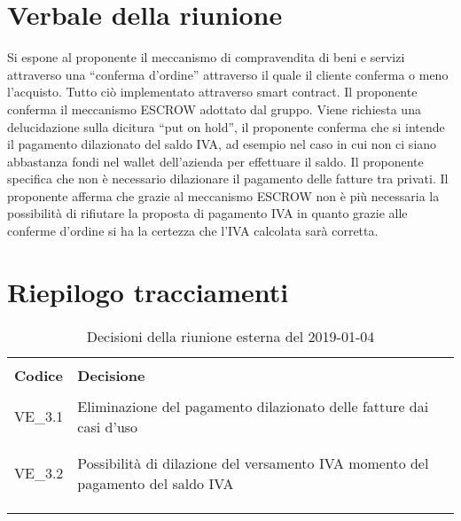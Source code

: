 \section{Verbale della riunione}

Si espone al proponente il meccanismo di compravendita di beni e servizi attraverso una “conferma d’ordine” attraverso il quale il cliente conferma o meno l’acquisto. Tutto ciò implementato attraverso smart contract. Il proponente conferma il meccanismo ESCROW adottato dal gruppo. \newline \newline
Viene richiesta una delucidazione sulla dicitura “put on hold”, il proponente conferma che si intende il pagamento dilazionato del saldo IVA, ad esempio nel caso in cui non ci siano abbastanza fondi nel wallet dell’azienda per effettuare il saldo. Il proponente specifica che non è necessario dilazionare il pagamento delle fatture tra privati. \newline \newline
Il proponente afferma che grazie al meccanismo ESCROW non è più necessaria la possibilità di rifiutare la proposta di pagamento IVA in quanto grazie alle conferme d’ordine si ha la certezza che l’IVA calcolata sarà corretta.

\pagebreak

\section{Riepilogo tracciamenti}
\begin{centering}
\begin{longtable}{ >{\centering}p{4cm} >{\centering}p{11cm} }

\hline
\\[0.5pt]
	\textbf{Codice} & \textbf{Decisione} 
	
	\tabularnewline 
	\hline
						
				\\[0.5pt]
				VE\_3.1 & Eliminazione del pagamento dilazionato delle fatture dai casi d’uso
				\\[0.5pt]
				\tabularnewline
				\hline
				
				\\[0.5pt]
				VE\_3.2 & Possibilità di dilazione del  versamento  IVA momento del pagamento del saldo IVA
				\\[0.5pt]
				\tabularnewline
				\hline
                
        \\[0.7pt]
        \caption{Decisioni della riunione esterna del 2019-01-04}
\end{longtable}
\end{centering}

